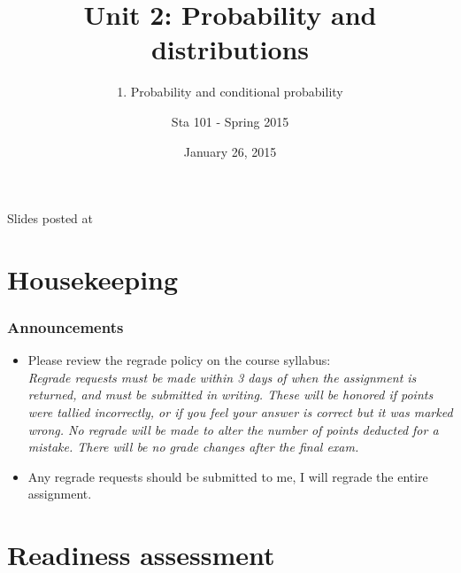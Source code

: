 \documentclass[slidestop,compress,mathserif,12pt,t,professionalfonts,xcolor=table]{beamer}
\title{Unit 2: Probability and distributions}
\subtitle{1. Probability and conditional probability}
\author{Sta 101 - Spring 2015}
\date{January 26, 2015}
\institute{Duke University, Department of Statistical Science}
\begin{document}



\begin{frame}[plain]

\titlepage
\vfill
{\scriptsize {} \hfill Slides posted at  \webLink{\CourseSite}{\CourseSite}}
\addtocounter{framenumber}{-1} 

\end{frame}


\section{Housekeeping}


\begin{frame}
\frametitle{Announcements}

\begin{itemize}

\item Please review the regrade policy on the course syllabus: \\
{\footnotesize \textit{Regrade requests must be made within 3 days of when the assignment is returned, and must be submitted in writing. These will be honored if points were tallied incorrectly, or if you feel your answer is correct but it was marked wrong. No regrade will be made to alter the number of points deducted for a mistake. There will be no grade changes after the final exam.}}

\item Any regrade requests should be submitted to me, I will regrade the entire assignment.

\end{itemize}

\note{

}

\end{frame}


\section{Readiness assessment}

\end{document}
